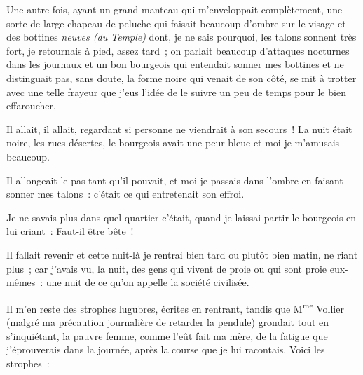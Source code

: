 \documentclass[french,twoside]{book} %
\begin{document}
Une autre fois, ayant un grand manteau qui m’enveloppait complètement, une sorte de large chapeau de peluche qui faisait beaucoup d’ombre sur le visage et des bottines \emph{neuves (du Temple)} dont, je ne sais pourquoi, les talons sonnent très fort, je retournais à pied, assez tard ; on parlait beaucoup d’attaques nocturnes dans les journaux et un bon bourgeois qui entendait sonner mes bottines et ne distinguait pas, sans doute, la forme noire qui venait de son côté, se mit à trotter avec une telle frayeur que j’eus l’idée de le suivre un peu de temps pour le bien effaroucher.\par
Il allait, il allait, regardant si personne ne viendrait à son secours ! La nuit était noire, les rues désertes, le bourgeois avait une peur bleue et moi je m’amusais beaucoup.\par
Il allongeait le pas tant qu’il pouvait, et moi je passais dans l’ombre en faisant sonner mes talons : c’était ce qui entretenait son effroi.\par
Je ne savais plus dans quel quartier c’était, quand je laissai partir le bourgeois en lui criant : Faut-il être bête !\par
Il fallait revenir et cette nuit-là je rentrai bien tard ou plutôt bien matin, ne riant plus ; car j’avais vu, la nuit, des gens qui vivent de proie  ou qui sont proie eux-mêmes : une nuit de ce qu’on appelle la société civilisée.\par
Il m’en reste des strophes lugubres, écrites en rentrant, tandis que M\textsuperscript{me} Vollier (malgré ma précaution journalière de retarder la pendule) grondait tout en s’inquiétant, la pauvre femme, comme l’eût fait ma mère, de la fatigue que j’éprouverais dans la journée, après la course que je lui racontais. Voici les strophes :\par
\end{document}
